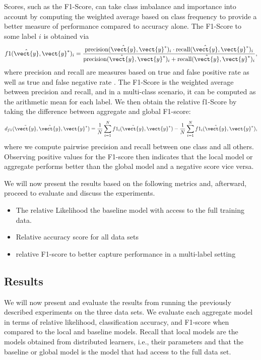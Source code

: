 Scores, such as the F1-Score, can take class imbalance and importance into account by computing the weighted average based on class frequency to provide a better measure of performance compared to accuracy alone.
The F1-Score \wrt to some label $i$ is obtained via 
\begin{equation}
    f1(\hat{\vect{y}},\vect{y}^*)_i = \frac{\text{precision}(\hat{\vect{y}},\vect{y}^*)_i \cdot \text{recall}(\hat{\vect{y}},\vect{y}^*)_i}{\text{precision}(\hat{\vect{y}},\vect{y}^*)_i + \text{recall}(\hat{\vect{y}},\vect{y}^*)_i},
\end{equation}
where precision and recall are measures based on true and false positive rate as well as true and false negative rate\cite{friedman2001elements} \cite{hossin2015review}.
The F1-Score is the weighted average between precision and recall, and in a multi-class scenario, it can be computed as the arithmetic mean for each label.
We then obtain the relative f1-Score by taking the difference between aggregate and global F1-score:
\begin{equation}
    d_{f1}(\tilde{\vect{y}}, \hat{\vect{y}},\vect{y}^*) = \frac{1}{N} \sum_{i=1}^N f1_i(\tilde{\vect{y}},\vect{y}^*) - \frac{1}{N} \sum_{i=1}^N f1_i(\hat{\vect{y}},\vect{y}^*),
\end{equation}
where we compute pairwise precision and recall between one class and all others.
Observing positive values for the F1-score then indicates that the local model or aggregate performs better than the global model and a negative score vice versa.

We will now present the results based on the following metrics and, afterward, proceed to evaluate and discuss the experiments.
\begin{itemize}
    \item The relative Likelihood \wrt the baseline model with access to the full training data.
    \item Relative accuracy score for all data sets
    \item relative F1-score to better capture performance in a multi-label setting 
\end{itemize}


\subsection{Results}
We will now present and evaluate the results from running the previously described experiments on the three data sets. 
We evaluate each aggregate model in terms of relative likelihood, classification accuracy, and F1-score when compared to the local and baseline models.
Recall that local models are the models obtained from distributed learners, i.e., their parameters and that the baseline or global model is the model that had access to the full data set.

